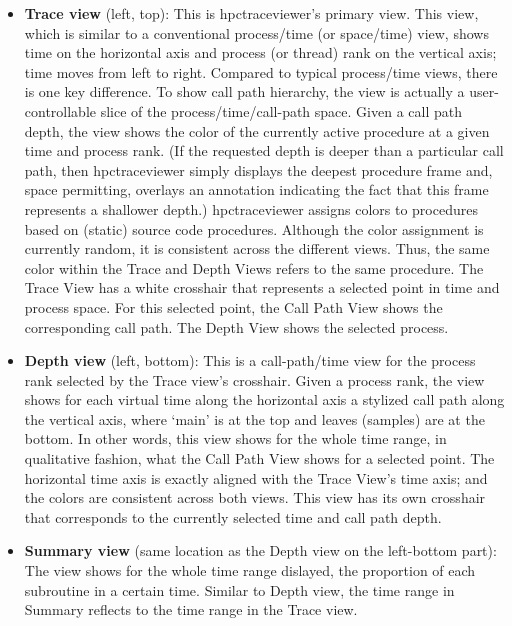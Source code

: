 \documentclass[english]{article}
\begin{document}
\begin{itemize}
\item \textbf{Trace view} (left, top):
  This is hpctraceviewer's primary view.
  This view, which is similar to a conventional process/time (or space/time) view, shows time on the horizontal axis and process (or thread) rank on the vertical axis; time moves from left to right.
  Compared to typical process/time views, there is one key difference.
  To show call path hierarchy, the view is actually a user-controllable slice of the process/time/call-path space.
  Given a call path depth, the view shows the color of the currently active procedure at a given time and process rank.
  (If the requested depth is deeper than a particular call path, then hpctraceviewer simply displays the deepest procedure frame and, space permitting, overlays an annotation indicating the fact that this frame represents a shallower depth.)
  hpctraceviewer assigns colors to procedures based on (static) source code procedures.
  Although the color assignment is currently random, it is consistent across the different views.
  Thus, the same color within the Trace and Depth Views refers to the same procedure.
  The Trace View has a white crosshair that represents a selected point in time and process space.
  For this selected point, the Call Path View shows the corresponding call path.
  The Depth View shows the selected process.

\item \textbf{Depth view} (left, bottom):
  This is a call-path/time view for the process rank selected by the Trace view's crosshair.
  Given a process rank, the view shows for each virtual time along the horizontal axis a stylized call path along the vertical axis, where `main' is at the top and leaves (samples) are at the bottom.
  In other words, this view shows for the whole time range, in qualitative fashion, what the Call Path View shows for a selected point.
  The horizontal time axis is exactly aligned with the Trace View's time axis; and the colors are consistent across both views.
  This view has its own crosshair that corresponds to the currently selected time and call path depth.

\item \textbf{Summary view} (same location as the Depth view on the left-bottom part):
  The view shows for the whole time range dislayed, the proportion of each subroutine in a certain time.
  Similar to Depth view, the time range in Summary reflects to the time range in the Trace view. 


\end{itemize}
\end{document}
